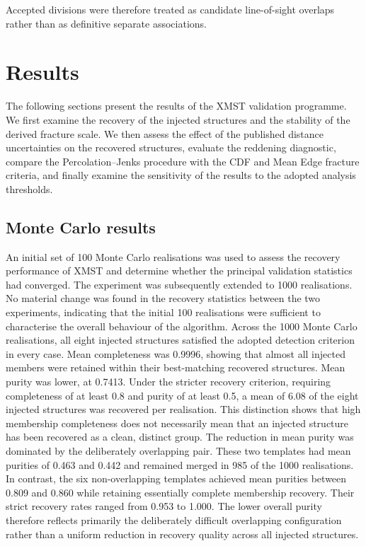 \documentclass[fleqn,usenatbib]{mnras}
\begin{document}
Accepted divisions were therefore treated as candidate line-of-sight overlaps rather than as definitive separate associations.



\section{Results}
The following sections present the results of the XMST validation programme. We first examine the recovery of the injected structures and the stability of the derived fracture scale. We then assess the effect of the published distance uncertainties on the recovered structures, evaluate the reddening diagnostic, compare the Percolation–Jenks procedure with the CDF and Mean Edge fracture criteria, and finally examine the sensitivity of the results to the adopted analysis thresholds.

\subsection{Monte Carlo results}
An initial set of 100 Monte Carlo realisations was used to assess the recovery performance of XMST and determine whether the principal validation statistics had converged. The experiment was subsequently extended to 1000 realisations. No material change was found in the recovery statistics between the two experiments, indicating that the initial 100 realisations were sufficient to characterise the overall behaviour of the algorithm.
Across the 1000 Monte Carlo realisations, all eight injected structures satisfied the adopted detection criterion in every case. Mean completeness was 0.9996, showing that almost all injected members were retained within their best-matching recovered structures. Mean purity was lower, at 0.7413. Under the stricter recovery criterion, requiring completeness of at least 0.8 and purity of at least 0.5, a mean of 6.08 of the eight injected structures was recovered per realisation. This distinction shows that high membership completeness does not necessarily mean that an injected structure has been recovered as a clean, distinct group.
The reduction in mean purity was dominated by the deliberately overlapping pair. These two templates had mean purities of 0.463 and 0.442 and remained merged in 985 of the 1000 realisations. In contrast, the six non-overlapping templates achieved mean purities between 0.809 and 0.860 while retaining essentially complete membership recovery. Their strict recovery rates ranged from 0.953 to 1.000. The lower overall purity therefore reflects primarily the deliberately difficult overlapping configuration rather than a uniform reduction in recovery quality across all injected structures.
\end{document}
